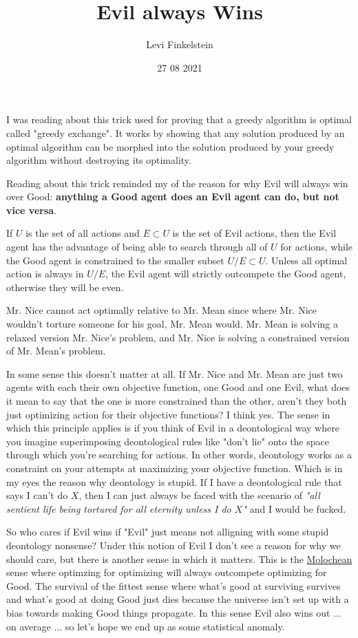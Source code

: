 \title{Evil always Wins}
\author{Levi Finkelstein}
\date{27 08 2021}

\maketitle

I was reading about this trick used for proving that a greedy algorithm is optimal called "greedy exchange". It works by showing that any solution produced by an optimal algorithm can be morphed into the solution produced by your greedy algorithm without destroying its optimality.
\par
Reading about this trick reminded my of the reason for why Evil will always win over Good: \textbf{anything a Good agent does an Evil agent can do, but not vice versa}.
\par
If $U$ is the set of all actions and $E\subset U$ is the set of Evil actions, then the Evil agent has the advantage of being able to search through all of $U$ for actions, while the Good agent is constrained to the smaller subset $U/E\subset U$. Unless all optimal action is always in $U/E$, the Evil agent will strictly outcompete the Good agent, otherwise they will be even.
\par
Mr. Nice cannot act optimally relative to Mr. Mean since where Mr. Nice wouldn't torture someone for his goal, Mr. Mean would. Mr. Mean is solving a relaxed version Mr. Nice's problem, and Mr. Nice is solving a constrained version of Mr. Mean's problem.
\par
In some sense this doesn't matter at all. If Mr. Nice and Mr. Mean are just two agents with each their own objective function, one Good and one Evil, what does it mean to say that the one is more constrained than the other, aren't they both just optimizing action for their objective functions? I think yes. The sense in which this principle applies is if you think of Evil in a deontological way where you imagine superimposing deontological rules like "don't lie" onto the space through which you're searching for actions. In other words, deontology works as a constraint on your attempts at maximizing your objective function. Which is in my eyes the reason why deontology is stupid. If I have a deontological rule that says I can't do $X$, then I can just always be faced with the scenario of \textit{"all sentient life being tortured for all eternity unless I do $X$"} and I would be fucked.
\par
So who cares if Evil wins if "Evil" just means not alligning with some stupid deontology nonsense? Under this notion of Evil I don't see a reason for why we should care, but there is another sense in which it matters. This is the \href{https://slatestarcodex.com/2014/07/30/meditations-on-moloch/}{Molochean} sense where optimzing for optimizing will always outcompete optimizing for Good. The survival of the fittest sense where what's good at surviving survives and what's good at doing Good just dies because the universe isn't set up with a bias towards making Good things propagate. In this sense Evil also wins out ... on average ... so let's hope we end up as some statistical anomaly.



